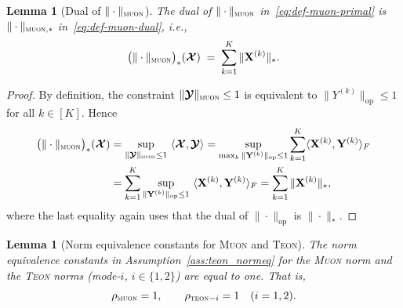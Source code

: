 \documentclass{article}
\newcommand{\ten}[1]{\bm{\mathcal{#1}}}
\newcommand{\mat}[1]{\mathbf{#1}}
\theoremstyle{plain}
\newtheorem{lemma}[theorem]{Lemma}
\theoremstyle{definition}
\theoremstyle{remark}
\begin{document}
\begin{lemma}[Dual of $\|\cdot\|_{\textsc{muon}}$]
\label{lem:dual-muon}
The dual of $\|\cdot\|_{\textsc{muon}}$ in~\eqref{eq:def-muon-primal} is
$\|\cdot\|_{\textsc{muon},*}$ in~\eqref{eq:def-muon-dual}, i.e.,
\begin{equation}
\label{eq:dual-muon}
\big(\|\cdot\|_{\textsc{muon}}\big)_*(\ten{X})
\;=\;
\sum_{k=1}^K \|\mat{X}^{(k)}\|_*.
\end{equation}
\end{lemma}

\begin{proof}
By definition, the constraint $\|\ten{Y}\|_{\textsc{muon}}\le 1$ is equivalent to
$\|Y^{(k)}\|_{\mathrm{op}}\le 1$ for all $k\in[K]$. Hence
\begin{align}
\big(\|\cdot\|_{\textsc{muon}}\big)_*(\ten{X})
&=
\sup_{\|\ten{Y}\|_{\textsc{muon}}\le 1}\ \langle \ten{X},\ten{Y}\rangle
=
\sup_{\max_{k}\|\mat{Y}^{(k)}\|_{\mathrm{op}}\le 1}
\sum_{k=1}^K \langle \mat{X}^{(k)},\mat{Y}^{(k)}\rangle_F
\nonumber\\
&=
\sum_{k=1}^K \sup_{\|\mat{Y}^{(k)}\|_{\mathrm{op}}\le 1}\ \langle \mat{X}^{(k)},\mat{Y}^{(k)}\rangle_F
=
\sum_{k=1}^K \|\mat{X}^{(k)}\|_*,
\end{align}
where the last equality again uses that the dual of $\|\cdot\|_{\mathrm{op}}$ is $\|\cdot\|_*$.
\end{proof}

\begin{lemma}[Norm equivalence constants for \textsc{Muon} and \textsc{Teon}]
\label{lem:rho_muon_teon}
The norm equivalence constants in Assumption~\ref{ass:teon_normeq}
for the \textsc{Muon} norm and the \textsc{Teon} norms
(mode-$i$, $i\in\{1,2\}$) are equal to one. That is,
\[
\rho_{\textsc{muon}} = 1,
\qquad
\rho_{\textsc{teon}-i} = 1 \quad (i=1,2).
\]
\end{lemma}
\end{document}
